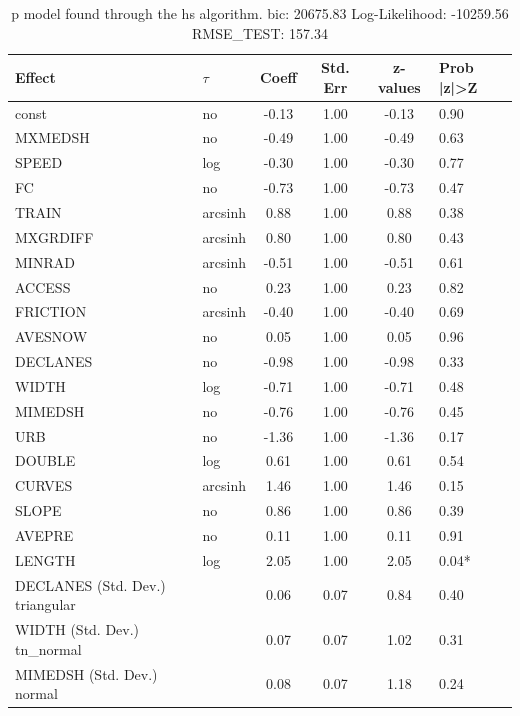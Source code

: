 \begin{table}
	\caption{p model found through the hs algorithm. bic: 20675.83 Log-Likelihood: -10259.56 RMSE_TEST: 157.34}
	\begin{center}
		\begin{tabular}{|l|l|c|c|c|l|}
			\hline
			Effect & $\tau$ & Coeff & Std. Err & z-values & Prob |z|>Z \\
			\hline
			const & no & -0.13 & 1.00 & -0.13 & 0.90 \\
			\hline
			MXMEDSH & no & -0.49 & 1.00 & -0.49 & 0.63 \\
			\hline
			SPEED & log & -0.30 & 1.00 & -0.30 & 0.77 \\
			\hline
			FC & no & -0.73 & 1.00 & -0.73 & 0.47 \\
			\hline
			TRAIN & arcsinh & 0.88 & 1.00 & 0.88 & 0.38 \\
			\hline
			MXGRDIFF & arcsinh & 0.80 & 1.00 & 0.80 & 0.43 \\
			\hline
			MINRAD & arcsinh & -0.51 & 1.00 & -0.51 & 0.61 \\
			\hline
			ACCESS & no & 0.23 & 1.00 & 0.23 & 0.82 \\
			\hline
			FRICTION & arcsinh & -0.40 & 1.00 & -0.40 & 0.69 \\
			\hline
			AVESNOW & no & 0.05 & 1.00 & 0.05 & 0.96 \\
			\hline
			DECLANES & no & -0.98 & 1.00 & -0.98 & 0.33 \\
			\hline
			WIDTH & log & -0.71 & 1.00 & -0.71 & 0.48 \\
			\hline
			MIMEDSH & no & -0.76 & 1.00 & -0.76 & 0.45 \\
			\hline
			URB & no & -1.36 & 1.00 & -1.36 & 0.17 \\
			\hline
			DOUBLE & log & 0.61 & 1.00 & 0.61 & 0.54 \\
			\hline
			CURVES & arcsinh & 1.46 & 1.00 & 1.46 & 0.15 \\
			\hline
			SLOPE & no & 0.86 & 1.00 & 0.86 & 0.39 \\
			\hline
			AVEPRE & no & 0.11 & 1.00 & 0.11 & 0.91 \\
			\hline
			LENGTH & log & 2.05 & 1.00 & 2.05 & 0.04* \\
			\hline
			DECLANES (Std. Dev.) triangular &  & 0.06 & 0.07 & 0.84 & 0.40 \\
			\hline
			WIDTH (Std. Dev.) tn_normal &  & 0.07 & 0.07 & 1.02 & 0.31 \\
			\hline
			MIMEDSH (Std. Dev.) normal &  & 0.08 & 0.07 & 1.18 & 0.24 \\

\end{tabular}
\end{center}
\end{table}
